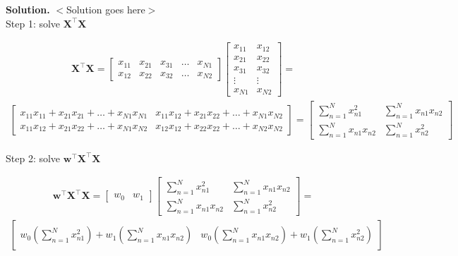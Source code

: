 \documentclass[10pt]{article}
\begin{document}
\begin{enumerate}
{\bf Solution.} $<$Solution goes here$>$\\%

Step 1: solve $\mathbf{X}^\top\mathbf{X}$ 

\begin{eqnarray*}
\mathbf{X}^\top\mathbf{X} = 
	\begin{bmatrix}
	x_{11} & x_{21} & x_{31} & \dots & x_{N1} \\[0.3em]
    x_{12} & x_{22} & x_{32} & \dots & x_{N2}
	\end{bmatrix}
    \begin{bmatrix}
    x_{11} & x_{12} \\[0.3em]
    x_{21} & x_{22} \\[0.3em]
    x_{31} & x_{32} \\[0.3em]
    \vdots & \vdots \\[0.3em]
    x_{N1} & x_{N2}
    \end{bmatrix} = 
\end{eqnarray*}
\begin{eqnarray*}
\begin{bmatrix}
    x_{11}x_{11} + x_{21}x_{21} + \dots + x_{N1}x_{N1} & x_{11}x_{12} + x_{21}x_{22} + \dots + x_{N1}x_{N2} \\[0.3em]
    x_{11}x_{12} + x_{21}x_{22} + \dots + x_{N1}x_{N2} & x_{12}x_{12} + x_{22}x_{22} + \dots + x_{N2}x_{N2}
    \end{bmatrix} =
    \begin{bmatrix}
    \sum_{n=1}^N x_{n1}^2 & \sum_{n=1}^N x_{n1}x_{n2} \\[0.3em]
    \sum_{n=1}^N x_{n1}x_{n2} & \sum_{n=1}^N x_{n2}^2
    \end{bmatrix}
\end{eqnarray*}

Step 2: solve $\mathbf{w}^\top\mathbf{X}^\top\mathbf{X}$

\begin{eqnarray*}
\mathbf{w}^\top\mathbf{X}^\top\mathbf{X} = 
    \begin{bmatrix}
	w_0 & w_1
    \end{bmatrix}
    \begin{bmatrix}
    \sum_{n=1}^N x_{n1}^2 & \sum_{n=1}^N x_{n1}x_{n2} \\[0.3em]
    \sum_{n=1}^N x_{n1}x_{n2} & \sum_{n=1}^N x_{n2}^2
    \end{bmatrix} =
\end{eqnarray*}
\begin{eqnarray*}
	\begin{bmatrix}
	w_0 \left( \sum_{n=1}^N x_{n1}^2 \right) + w_1 \left( \sum_{n=1}^N x_{n1}x_{n2} \right) & w_0 \left( \sum_{n=1}^N x_{n1}x_{n2} \right) + w_1 \left( \sum_{n=1}^N x_{n2}^2 \right)
	\end{bmatrix}
\end{eqnarray*}


\end{enumerate}
\end{document}
